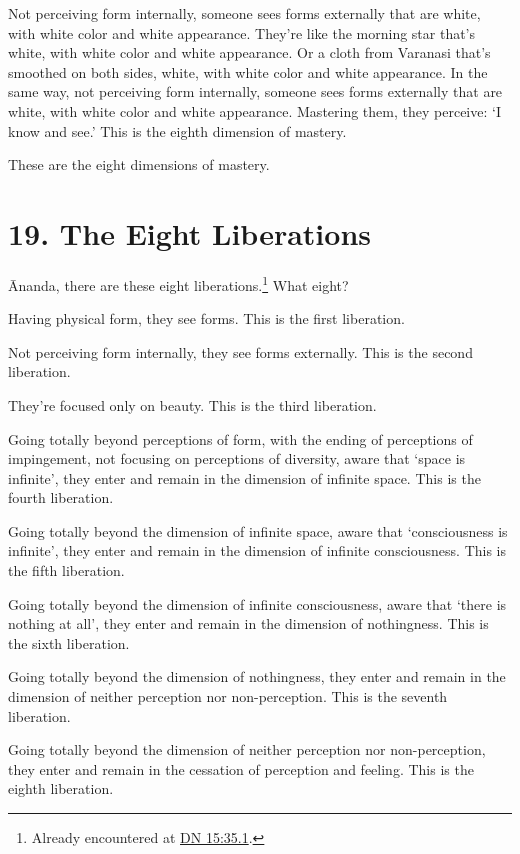 \documentclass[12pt,openany]{book}%
\begin{document}
Not perceiving form internally, someone sees forms externally that are white, with white color and white appearance. They’re like the morning star that’s white, with white color and white appearance. Or a cloth from Varanasi that’s smoothed on both sides, white, with white color and white appearance. In the same way, not perceiving form internally, someone sees forms externally that are white, with white color and white appearance. Mastering them, they perceive: ‘I know and see.’ This is the eighth dimension of mastery. 

These are the eight dimensions of mastery. 

\section*{19. The Eight Liberations }

Ānanda, there are these eight liberations.\footnote{Already encountered at \href{https://suttacentral.net/dn15/en/sujato\#35.1}{DN 15:35.1}. } What eight? 

Having physical form, they see forms. This is the first liberation. 

Not perceiving form internally, they see forms externally. This is the second liberation. 

They’re focused only on beauty. This is the third liberation. 

Going totally beyond perceptions of form, with the ending of perceptions of impingement, not focusing on perceptions of diversity, aware that ‘space is infinite’, they enter and remain in the dimension of infinite space. This is the fourth liberation. 

Going totally beyond the dimension of infinite space, aware that ‘consciousness is infinite’, they enter and remain in the dimension of infinite consciousness. This is the fifth liberation. 

Going totally beyond the dimension of infinite consciousness, aware that ‘there is nothing at all’, they enter and remain in the dimension of nothingness. This is the sixth liberation. 

Going totally beyond the dimension of nothingness, they enter and remain in the dimension of neither perception nor non-perception. This is the seventh liberation. 

Going totally beyond the dimension of neither perception nor non-perception, they enter and remain in the cessation of perception and feeling. This is the eighth liberation. 
\end{document}
